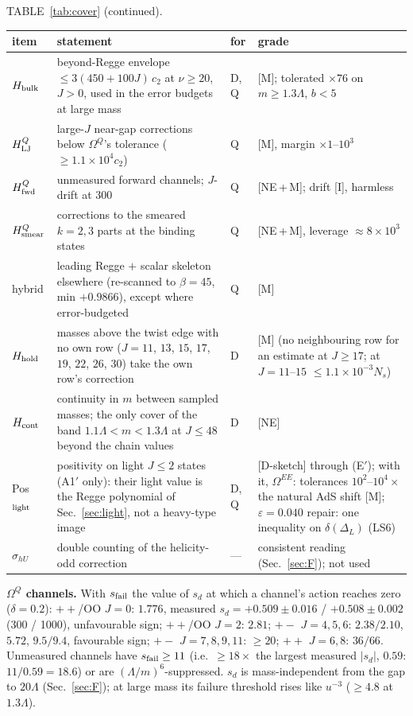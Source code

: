 \documentclass[aps,prl,onecolumn,superscriptaddress,nofootinbib]{revtex4-2}
\begin{document}
\begin{table}[!htbp]
\footnotesize
\centering TABLE~\ref{tab:cover} (continued).\par\smallskip
\begin{ruledtabular}
\begin{tabular}{L{1.9cm}L{9.6cm}L{0.8cm}L{4.0cm}}
item & statement & for & grade\\\hline
$H_{\rm bulk}$ & beyond-Regge envelope $\le3(450+100J)\,c_2$ at $\nu\ge20$, $J>0$, used in the error budgets at large mass & D, Q & [M]; tolerated $\times76$ on $m\ge1.3\Lambda$, $b<5$\\
$H_{\rm LJ}^Q$ & large-$J$ near-gap corrections below $\Omega^Q$'s tolerance ($\ge1.1\times10^4c_2$) & Q & [M], margin $\times1$--$10^3$\\
$H_{\rm fwd}^Q$ & unmeasured forward channels; $J$-drift at 300 & Q & [NE\,+\,M]; drift [I], harmless\\
$H_{\rm smear}^Q$ & corrections to the smeared $k=2,3$ parts at the binding states & Q & [NE\,+\,M], leverage $\approx8\times10^3$\\
hybrid & leading Regge $+$ scalar skeleton elsewhere (re-scanned to $\beta=45$, min $+0.9866$), except where error-budgeted & Q & [M]\\
$H_{\rm hold}$ & masses above the twist edge with no own row ($J=11$, $13$, $15$, $17$, $19$, $22$, $26$, $30$) take the own row's correction & D & [M] (no neighbouring row for an estimate at $J\ge17$; at $J=11$--$15$ $\le1.1\times10^{-3}N_s$)\\
$H_{\rm cont}$ & continuity in $m$ between sampled masses; the only cover of the band $1.1\Lambda<m<1.3\Lambda$ at $J\le48$ beyond the chain values & D & [NE]\\
Pos$_{\rm light}$ & positivity on light $J\le2$ states (A1$'$ only): their light value is the Regge polynomial of Sec.~\ref{sec:light}, not a heavy-type image & D, Q & [D-sketch] through (E$'$); with it, $\Omega^{EE}$: tolerances $10^2$--$10^4\times$ the natural AdS shift [M]; $\varepsilon=0.040$ repair: one inequality on $\delta(\Delta_L)$ (LS6)\\
$\sigma_{hU}$ & double counting of the helicity-odd correction & --- & consistent reading (Sec.~\ref{sec:F}); not used\\
\end{tabular}
\end{ruledtabular}
\end{table}

\textbf{$\Omega^Q$ channels.} With $s_{\rm fail}$ the value of $s_d$ at which a channel's action reaches
zero ($\delta=0.2$): $++$/OO $J=0$: $1.776$, measured $s_d=+0.509\pm0.016$ / $+0.508\pm0.002$ (300 /
1000), unfavourable sign; $++$/OO $J=2$: $2.81$; $+-$ $J=4,5,6$: $2.38/2.10$, $5.72$, $9.5/9.4$, favourable
sign; $+-$ $J=7,8,9,11$: $\ge20$; $++$ $J=6,8$: $36/66$. Unmeasured channels have $s_{\rm fail}\ge11$
(i.e.\ $\ge18\times$ the largest measured $|s_d|$, $0.59$: $11/0.59=18.6$) or are $(\Lambda/m)^6$-suppressed. $s_d$ is
mass-independent from the gap to $20\Lambda$ (Sec.~\ref{sec:F}); at large mass its failure threshold rises
like $u^{-3}$ ($\ge4.8$ at $1.3\Lambda$).
\end{document}
